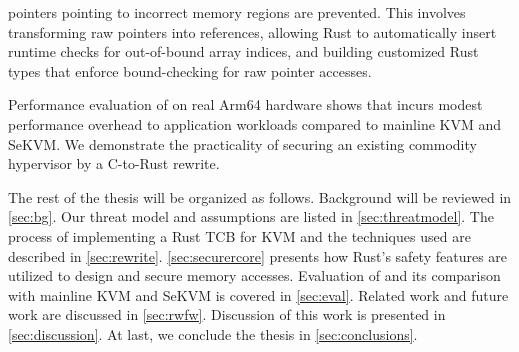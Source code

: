 pointers pointing to incorrect memory regions are prevented.
This involves transforming raw pointers into references, allowing Rust to
automatically insert runtime checks for out-of-bound array indices, and
building customized Rust types that enforce bound-checking for raw pointer
accesses.


Performance evaluation of \rustsec{} on real Arm64 hardware shows that
\rustsec{} incurs modest performance overhead to application workloads
compared to mainline KVM and SeKVM. We demonstrate the practicality of
securing an existing commodity hypervisor by a C-to-Rust rewrite.

The rest of the thesis will be organized as follows. Background
will be reviewed in \autoref{sec:bg}. Our threat model and assumptions are
listed in \autoref{sec:threatmodel}. The process of implementing a Rust TCB
for KVM and the techniques used are described in \autoref{sec:rewrite}.
\autoref{sec:securercore} presents how Rust's safety features are utilized to
design and secure \rustcore{} memory accesses.
Evaluation of \rustsec{} and its comparison with mainline KVM and SeKVM is
covered in \autoref{sec:eval}. Related work and future work are discussed in
\autoref{sec:rwfw}. Discussion of this work is presented in \autoref{sec:discussion}.
At last, we conclude the thesis in \autoref{sec:conclusions}.
